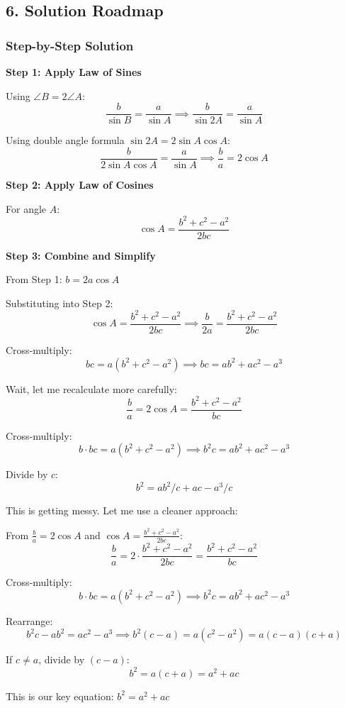 \documentclass[12pt]{article}
\begin{document}
\begin{solutionbox}
\subsection*{6. Solution Roadmap}

\subsubsection*{Step-by-Step Solution}

\textbf{Step 1: Apply Law of Sines}

Using $\angle B = 2\angle A$:
$$\frac{b}{\sin B} = \frac{a}{\sin A} \implies \frac{b}{\sin 2A} = \frac{a}{\sin A}$$

Using double angle formula $\sin 2A = 2\sin A \cos A$:
$$\frac{b}{2\sin A \cos A} = \frac{a}{\sin A} \implies \frac{b}{a} = 2\cos A$$

\textbf{Step 2: Apply Law of Cosines}

For angle $A$:
$$\cos A = \frac{b^2 + c^2 - a^2}{2bc}$$

\textbf{Step 3: Combine and Simplify}

From Step 1: $b = 2a\cos A$

Substituting into Step 2:
$$\cos A = \frac{b^2 + c^2 - a^2}{2bc} \implies \frac{b}{2a} = \frac{b^2 + c^2 - a^2}{2bc}$$

Cross-multiply:
$$bc = a(b^2 + c^2 - a^2) \implies bc = ab^2 + ac^2 - a^3$$

Wait, let me recalculate more carefully:
$$\frac{b}{a} = 2\cos A = \frac{b^2 + c^2 - a^2}{bc}$$

Cross-multiply:
$$b \cdot bc = a(b^2 + c^2 - a^2) \implies b^2c = ab^2 + ac^2 - a^3$$

Divide by $c$:
$$b^2 = ab^2/c + ac - a^3/c$$

This is getting messy. Let me use a cleaner approach:

From $\frac{b}{a} = 2\cos A$ and $\cos A = \frac{b^2+c^2-a^2}{2bc}$:
$$\frac{b}{a} = 2 \cdot \frac{b^2+c^2-a^2}{2bc} = \frac{b^2+c^2-a^2}{bc}$$

Cross-multiply:
$$b \cdot bc = a(b^2+c^2-a^2) \implies b^2c = ab^2 + ac^2 - a^3$$

Rearrange:
$$b^2c - ab^2 = ac^2 - a^3 \implies b^2(c-a) = a(c^2-a^2) = a(c-a)(c+a)$$

If $c \neq a$, divide by $(c-a)$:
$$b^2 = a(c+a) = a^2 + ac$$

This is our key equation: $\boxed{b^2 = a^2 + ac}$


\end{solutionbox}
\end{document}
